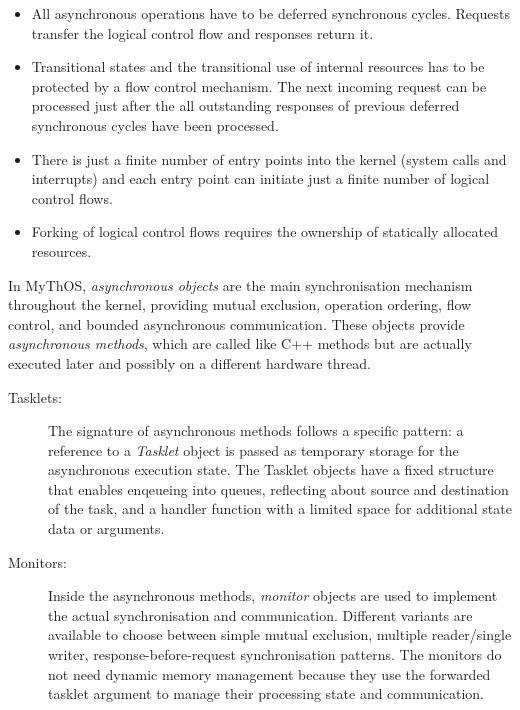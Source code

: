 \begin{itemize}
\item All asynchronous operations have to be deferred synchronous cycles. Requests transfer the logical control flow and responses return it.
\item Transitional states and the transitional use of internal resources has to be protected by a flow control mechanism. The next incoming request can be processed just after the all outstanding responses of previous deferred synchronous cycles have been processed.
\item There is just a finite number of entry points into the kernel (system calls and interrupts) and each entry point can initiate just a finite number of logical control flows.
\item Forking of logical control flows requires the ownership of statically allocated resources.
\end{itemize}

In MyThOS, \emph{asynchronous objects} are the main synchronisation mechanism throughout the kernel, providing mutual exclusion, operation ordering, flow control, and bounded asynchronous communication. These objects provide \emph{asynchronous methods}, which are called like C++ methods but are actually executed later and possibly on a different hardware thread.

\begin{description}
\item[Tasklets:] 
The signature of asynchronous methods follows a specific pattern: a reference to a \emph{Tasklet} object is passed as temporary storage for the asynchronous execution state. The Tasklet objects have a fixed structure that enables enqeueing into queues, reflecting about source and destination of the task, and a handler function with a limited space for additional state data or arguments.

\item[Monitors:] 
Inside the asynchronous methods, \emph{monitor} objects are used to implement the actual synchronisation and communication. Different variants are available to choose between simple mutual exclusion, multiple reader/single writer, response-before-request synchronisation patterns. The monitors do not need dynamic memory management because they use the forwarded tasklet argument to manage their processing state and communication. 
\end{description}

